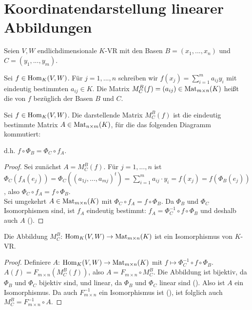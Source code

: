 \section{Koordinatendarstellung linearer Abbildungen}

Seien $V,W$ endlichdimensionale $K$-VR mit den Basen $B=(x_1,...,x_n)$ und $C=(y_1,...,y_m)$.

\begin{definition}
	Sei $f\in \operatorname{Hom}_K(V,W)$. Für $j=1,...,n$ schreiben wir $f(x_j)=\sum_{
		i=1}^m a_{ij}y_i$ mit eindeutig bestimmten $a_{ij}\in K$. Die Matrix $M_C^B(f)=(a_{ij})\in \operatorname{Mat}_{m\times n}(K)$ 
	heißt die  von $f$ bezüglich der Basen $B$ und $C$.
\end{definition}

\begin{proposition}
	Sei $f\in \operatorname{Hom}_K(V,W)$. Die darstellende Matrix $M_C^B(f)$ ist die eindeutig bestimmte Matrix $A\in 
	\operatorname{Mat}_{n\times m}(K)$, für die das folgenden Diagramm kommutiert: \\
	\begin{center}\end{center}
	d.h. $f\circ \Phi_B=\Phi_C\circ f_A$.
\end{proposition}
\begin{proof}
	Sei zunächst $A=M_C^B(f)$. Für $j=1,...,n$ ist $\Phi_C(f_A(e_j))=\Phi_C((a_{1j},...,a_{mj})^t)=\sum_{i=1}^m 
	a_{ij}\cdot y_i=f(x_j)=f(\Phi_B(e_j))$, also $\Phi_C\circ f_A=f \circ \Phi_B$. \\
	Sei umgekehrt $A\in \operatorname{Mat}_{m\times n}(K)$ mit $\Phi_C\circ f_A=f\circ\Phi_B$. Da $\Phi_B$ und $\Phi_C$ Isomorphismen 
	sind, ist $f_A$ eindeutig bestimmt: $f_A=\Phi_C^{-1}\circ f \circ \Phi_B$ und deshalb auch $A$ ().
\end{proof}

\begin{conclusion}
	Die Abbildung $M_C^B$: $\operatorname{Hom}_K(V,W)\to \operatorname{Mat}_{m\times n}(K)$ ist ein Isomorphismus von $K$-VR.
\end{conclusion}
\begin{proof}
	Definiere $A$: $\operatorname{Hom}_K(V,W)\to \operatorname{Mat}_{m\times n}(K)$ mit $f\mapsto \Phi_C^{-1}\circ f \circ \Phi_B$. $A(f)=F_{m\times n}
	(M_C^B(f))$, also $A=F_{m\times n}\circ M_C^B$. Die Abbildung ist bijektiv, da $\Phi_B$ und $\Phi_C$ bijektiv sind, 
	und linear, da $\Phi_B$ und $\Phi_C$ linear sind (). Also ist $A$ ein Isomorphismus. Da auch $F_{m\times n}^{-1}$ ein 
	Isomorphismus ist (), ist folglich auch $M_C^B=F_{m\times n}^{-1}\circ A$.
\end{proof}


